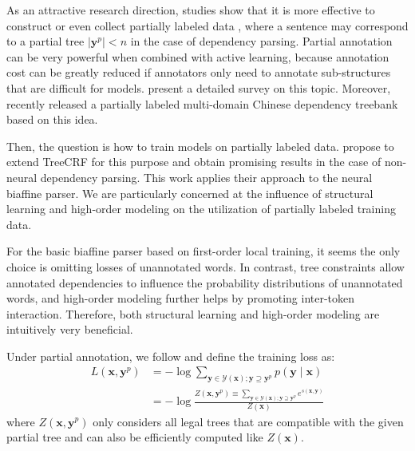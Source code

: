As an attractive research direction, studies show that
it is more effective to construct or even collect partially labeled data \cite{nivre-etal-2014-squibs,hwa-99-partial-annotation,pereira-92-inside-outside},
where %
a sentence may correspond to a partial tree $|{\boldsymbol{y}^p}| < n$ in the case of dependency parsing.
Partial annotation can be very powerful when combined with active learning, because
annotation cost can be greatly reduced if annotators only need to annotate sub-structures that are difficult for models. %
\citet{li-etal-2016-active} present a detailed survey on this topic.
Moreover, \citet{peng2019overview} recently released a partially labeled multi-domain Chinese dependency treebank based on this idea.

Then, the question is how to train models on partially labeled data.
\citet{li-etal-2016-active} propose to extend TreeCRF for this purpose and obtain promising results
in the case of non-neural dependency parsing.
This work applies their approach to the neural biaffine parser.
We are particularly concerned at the influence of structural learning and high-order modeling on the utilization of partially labeled training data.

For the basic biaffine parser based on first-order local training, it seems  the only choice is omitting losses of unannotated words.
In contrast, tree constraints allow annotated dependencies to influence the
probability distributions of unannotated words, and high-order modeling further helps by promoting inter-token interaction.
Therefore, both structural learning and high-order modeling are intuitively very beneficial.

Under partial annotation, we follow \citet{li-etal-2016-active} and define the training loss as:
\begin{equation}
    \label{equation:training-loss-treecrf-partial}
    \begin{split}
        \mathit{L}(\boldsymbol{x}, {\boldsymbol{y}^p}) &= -\log \sum\limits_{\boldsymbol{y} \in \mathcal{Y}(\boldsymbol{x}); \boldsymbol{y} \supseteq {\boldsymbol{y}^p}} p(\boldsymbol{y}\mid\boldsymbol{x})  \\
        &= - \log \frac{Z(\boldsymbol{x}, {\boldsymbol{y}^p}) \equiv \sum\limits_{\boldsymbol{y} \in \mathcal{Y}(\boldsymbol{x}); \boldsymbol{y} \supseteq \boldsymbol{y}^p} e^{s(\boldsymbol{x},\boldsymbol{y})}}{Z(\boldsymbol{x})}
    \end{split}
\end{equation}
where $Z(\boldsymbol{x}, {\boldsymbol{y}^p})$ only considers all legal trees that are compatible with the given partial tree and can also be efficiently computed like $Z(\boldsymbol{x})$.


